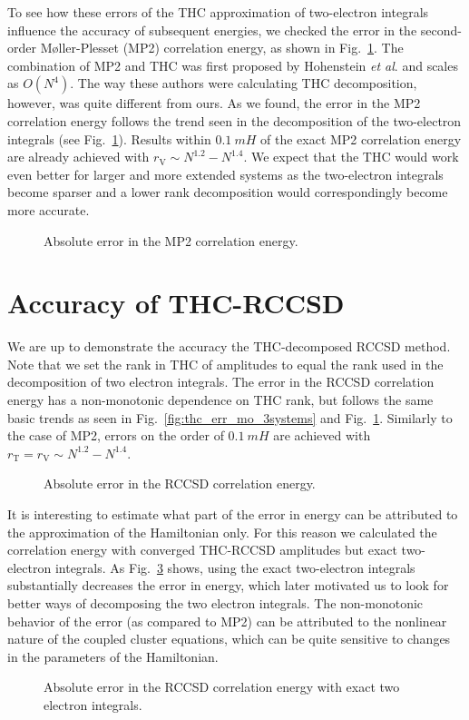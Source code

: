 To see how these errors of the THC approximation of two-electron 
integrals influence the accuracy of subsequent energies, we checked 
the error in the second-order M{\o}ller-Plesset (MP2) correlation
energy, as shown in Fig.~\ref{fig:mp2_err_ao_full}.  The combination
of MP2 and THC was first proposed by Hohenstein \emph{et
al}.\cite{hohenstein_thc2} and scales as $O(N^4)$.  The way these authors were 
calculating THC decomposition, however, was quite different from ours.
As we found, the error in the MP2 correlation energy follows the trend seen in 
the decomposition of the two-electron integrals (see 
Fig.~\ref{fig:mp2_err_ao_full}). Results within $0.1~mH$
of the exact MP2 correlation energy are already achieved with
$r_\mathrm{V} \sim N^{1.2} - N^{1.4}$.
We expect that the THC would work even better for larger and more extended 
systems as the two-electron integrals become sparser and a lower rank 
decomposition would correspondingly become more accurate.
%
\begin{figure}[tb]
\caption{Absolute error in the MP2 correlation energy.
\label{fig:mp2_err_ao_full}}
\end{figure}
%
\section{Accuracy of THC-RCCSD}
We are up to demonstrate the accuracy the THC-decomposed RCCSD
method. Note that we set the rank in THC of amplitudes to equal the rank 
used in the decomposition of two electron integrals. The error in the RCCSD 
correlation energy has a non-monotonic dependence on THC rank, but follows the 
same basic trends as seen in Fig.~\ref{fig:thc_err_mo_3systems} and
Fig.~\ref{fig:mp2_err_ao_full}. Similarly to the case of MP2, errors on 
the order of $0.1~mH$ are achieved with $r_\mathrm{T} = r_\mathrm{V} \sim 
N^{1.2} - N^{1.4}$.
%
\begin{figure}[tb]
\caption{Absolute error in the RCCSD correlation energy.
\label{fig:cc_err_ao_full}}
\end{figure}
%
It is interesting to estimate what part of the error in energy can be
attributed to the approximation of the Hamiltonian only. For this reason we 
calculated the correlation energy with converged THC-RCCSD amplitudes but exact
two-electron integrals.  As Fig.~\ref{fig:cc_err_ao_full_amps_only}
shows, using the exact two-electron integrals substantially decreases the error 
in energy, which later motivated us to look for better ways of decomposing the 
two electron integrals. The non-monotonic behavior of the error (as compared to 
MP2) can be attributed to the nonlinear nature of the coupled cluster 
equations, which can be quite sensitive to changes in the parameters of the 
Hamiltonian.
%
\begin{figure}[tb]
\caption{Absolute error in the RCCSD correlation energy with exact two
electron integrals.
\label{fig:cc_err_ao_full_amps_only}}
\end{figure}
%
